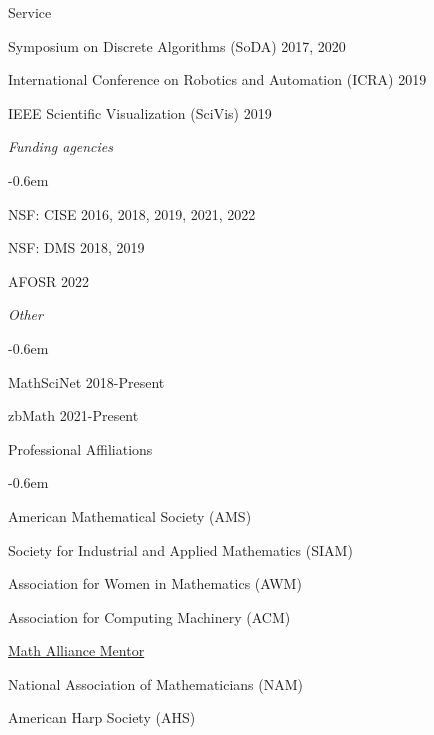\documentclass{resume} %
\begin{document}
\begin{rSection}{Service}
\begin{list}{}{\leftmargin=1em}
   \item Symposium on Discrete Algorithms (SoDA) \hfill 2017, 2020
   \item International Conference on Robotics and Automation (ICRA) \hfill 2019
   \item IEEE Scientific Visualization (SciVis) \hfill 2019
\end{list}
\textit{Funding agencies}
\begin{list}{}{\leftmargin=1em}
   \itemsep -0.6em \vspace{-0.5em} %
   \item NSF: CISE  \hfill 2016, 2018, 2019, 2021, 2022
   \item NSF: DMS \hfill 2018, 2019
   \item AFOSR \hfill 2022
\end{list}
\textit{Other}
\begin{list}{}{\leftmargin=1em}
   \itemsep -0.6em \vspace{-0.5em} %
   \item MathSciNet \hfill 2018-Present
   \item zbMath \hfill 2021-Present
\end{list}

\end{rSection}
\begin{rSection}{Professional Affiliations}

\begin{list}{}{\leftmargin=0em}
   \itemsep -0.6em %
 \item American Mathematical Society (AMS)
 \item Society for Industrial and Applied Mathematics (SIAM)
 \item Association for Women in Mathematics (AWM)
 \item Association for Computing Machinery (ACM)
 \item \href{https://mathalliance.org/mentor/liz-munch/}{Math Alliance Mentor}
 \item National Association of Mathematicians (NAM)
 \item American Harp Society (AHS)
\end{list}


\end{rSection}
\end{document}
